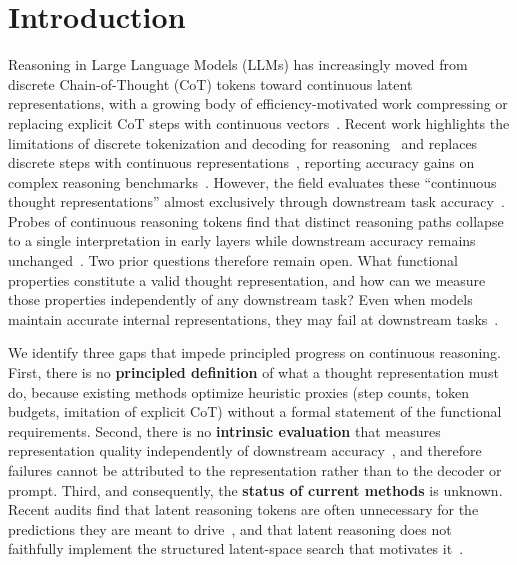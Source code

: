 \section{Introduction}
\label{introduction}

Reasoning in Large Language Models (LLMs) has increasingly moved from discrete Chain-of-Thought (CoT) tokens toward continuous latent representations, with a growing body of efficiency-motivated work compressing or replacing explicit CoT steps with continuous vectors~\citep{sui2025stopoverthinkingsurveyefficient, feng2025efficientreasoningmodelssurvey}. Recent work highlights the limitations of discrete tokenization and decoding for reasoning~\citep{hao2024training} and replaces discrete steps with continuous representations~\citep{butt2026soft, zhang2025softthinkingunlockingreasoning}, reporting accuracy gains on complex reasoning benchmarks~\citep{wu2026llms}. However, the field evaluates these ``continuous thought representations'' almost exclusively through downstream task accuracy~\citep{mondorf2024accuracyevaluatingreasoningbehavior}. Probes of continuous reasoning tokens find that distinct reasoning paths collapse to a single interpretation in early layers while downstream accuracy remains unchanged~\citep{rizvi-martel2026the}. Two prior questions therefore remain open. What functional properties constitute a valid thought representation, and how can we measure those properties independently of any downstream task? Even when models maintain accurate internal representations, they may fail at downstream tasks~\citep{ye2026mechanistic}.



We identify three gaps that impede principled progress on continuous reasoning. First, there is no \textbf{principled definition} of what a thought representation must do, because existing methods optimize heuristic proxies (step counts, token budgets, imitation of explicit CoT) without a formal statement of the functional requirements. Second, there is no \textbf{intrinsic evaluation} that measures representation quality independently of downstream accuracy~\citep{sahoo2026when}, and therefore failures cannot be attributed to the representation rather than to the decoder or prompt. Third, and consequently, the \textbf{status of current methods} is unknown. Recent audits find that latent reasoning tokens are often unnecessary for the predictions they are meant to drive~\citep{dilgren2026are}, and that latent reasoning does not faithfully implement the structured latent-space search that motivates it~\citep{cui2026how}.

